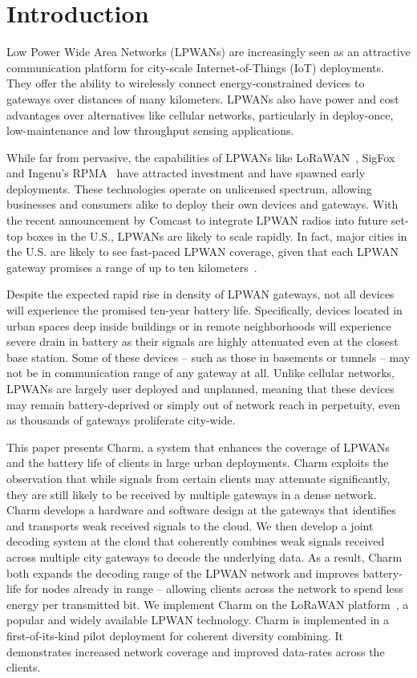 
\section{Introduction}
\label{sec:intro}

Low Power Wide Area Networks (LPWANs) are increasingly seen as an attractive
communication platform for city-scale Internet-of-Things (IoT) deployments.
They offer the ability to wirelessly connect energy-constrained devices to
gateways over distances of many kilometers. LPWANs also have power and cost
advantages over alternatives like cellular networks, particularly in
deploy-once, low-maintenance and low throughput sensing applications.

While far from pervasive, the capabilities of LPWANs like
LoRaWAN~\cite{Sornin2015, LoRaWanAlliance2015}, SigFox~\cite{centenaro2016}
and Ingenu's RPMA~\cite{Ingenu2015} have attracted investment and have spawned
early deployments. These technologies operate on unlicensed spectrum, allowing
businesses and consumers alike to deploy their own devices and gateways. With
the recent announcement by Comcast \cite{comcast, comcast2} to integrate
LPWAN radios into future set-top boxes in the U.S., LPWANs are likely to
scale rapidly. In fact, major cities in the U.S. are likely to see fast-paced
LPWAN coverage, given that each LPWAN gateway promises a range of up to ten
kilometers~\cite{LoRaWanAlliance2015}.

Despite the expected rapid rise in density of LPWAN gateways, not all
devices will experience the promised ten-year battery life. Specifically,
devices located in urban spaces deep inside buildings or in remote
neighborhoods will experience severe drain in battery as their signals are
highly attenuated even at the closest base station. Some of these devices --
such as those in basements or tunnels -- may not be in communication range of
any gateway at all. Unlike cellular networks, LPWANs are largely user
deployed and unplanned, meaning that these devices may remain battery-deprived
or simply out of network reach in perpetuity, even as thousands of gateways
proliferate city-wide.

This paper presents Charm, a system that enhances the coverage of LPWANs and
the battery life of clients in large urban deployments. Charm exploits the
observation that while signals from certain clients may attenuate
significantly, they are still likely to be received by multiple gateways in a
dense network. Charm develops a hardware and software design at the gateways
that identifies and transports weak received signals to the cloud. We then
develop a joint decoding system at the cloud that coherently combines weak
signals received across multiple city gateways to decode the underlying data.
As a result, Charm both expands the decoding range of the LPWAN network and
improves battery-life for nodes already in range -- allowing clients across
the network to spend less energy per transmitted bit. We implement Charm on
the LoRaWAN platform~\cite{LoRaWanAlliance2015}, a popular and widely
available LPWAN technology. Charm is implemented in a first-of-its-kind pilot
deployment for coherent diversity combining. It demonstrates increased
network coverage and improved data-rates across the clients.


